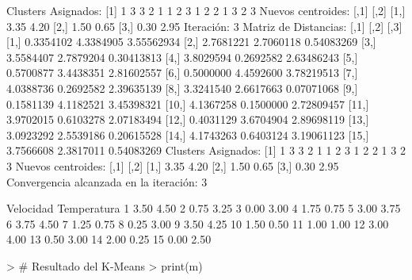 \documentclass[a4paper, 12pt]{article}
\begin{document}
\begin{itemize}
\begin{Schunk}
\begin{Soutput}
Clusters Asignados:
 [1] 1 3 3 2 1 1 2 3 1 2 2 1 3 2 3
Nuevos centroides: 
     [,1] [,2]
[1,] 3.35 4.20
[2,] 1.50 0.65
[3,] 0.30 2.95
Iteración:  3 
Matriz de Distancias:
           [,1]      [,2]       [,3]
 [1,] 0.3354102 4.3384905 3.55562934
 [2,] 2.7681221 2.7060118 0.54083269
 [3,] 3.5584407 2.7879204 0.30413813
 [4,] 3.8029594 0.2692582 2.63486243
 [5,] 0.5700877 3.4438351 2.81602557
 [6,] 0.5000000 4.4592600 3.78219513
 [7,] 4.0388736 0.2692582 2.39635139
 [8,] 3.3241540 2.6617663 0.07071068
 [9,] 0.1581139 4.1182521 3.45398321
[10,] 4.1367258 0.1500000 2.72809457
[11,] 3.9702015 0.6103278 2.07183494
[12,] 0.4031129 3.6704904 2.89698119
[13,] 3.0923292 2.5539186 0.20615528
[14,] 4.1743263 0.6403124 3.19061123
[15,] 3.7566608 2.3817011 0.54083269
Clusters Asignados:
 [1] 1 3 3 2 1 1 2 3 1 2 2 1 3 2 3
Nuevos centroides: 
     [,1] [,2]
[1,] 3.35 4.20
[2,] 1.50 0.65
[3,] 0.30 2.95
Convergencia alcanzada en la iteración: 3 
\end{Soutput}
\begin{Soutput}
   Velocidad Temperatura
1       3.50        4.50
2       0.75        3.25
3       0.00        3.00
4       1.75        0.75
5       3.00        3.75
6       3.75        4.50
7       1.25        0.75
8       0.25        3.00
9       3.50        4.25
10      1.50        0.50
11      1.00        1.00
12      3.00        4.00
13      0.50        3.00
14      2.00        0.25
15      0.00        2.50
\end{Soutput}
\begin{Sinput}
> # Resultado del K-Means
> print(m)
\end{Sinput}
\end{Schunk}
\end{itemize}
\end{document}

